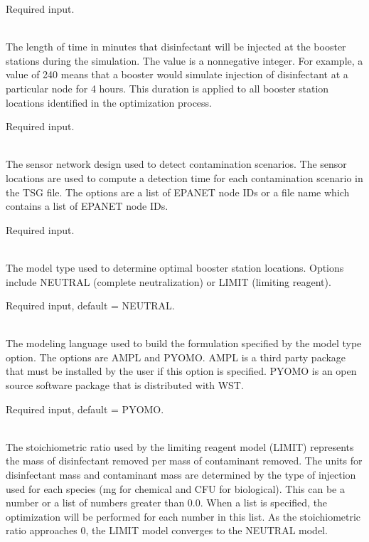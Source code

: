 \begin{description}[topsep=0pt,parsep=0.5em,itemsep=-0.4em]
\begin{description}[topsep=0pt,parsep=0.5em,itemsep=-0.4em]
                Required input.
    \item[{duration}]\hfill
\\The length of time in minutes that disinfectant will be injected at the booster 
                stations during the simulation.	The value is a nonnegative integer. For example, 
                a value of 240 means that a booster would simulate injection of disinfectant 
                at a particular node for 4 hours. This duration is applied to all booster 
                station locations identified in the optimization process.
                
                Required input.
  \end{description}
  \item[{booster mip}]\hfill
  \begin{description}[topsep=0pt,parsep=0.5em,itemsep=-0.4em]
    \item[{detection}]\hfill
\\The sensor network design used to detect contamination scenarios. The
                sensor locations are used to compute a detection time for each 
                contamination scenario in the TSG file. The options are a list of 
                EPANET node IDs or a file name which contains a list of EPANET node IDs.
                
                Required input.
    \item[{model type}]\hfill
\\The model type used to determine optimal booster station
                locations. Options include NEUTRAL (complete neutralization)
                or LIMIT (limiting reagent). 
                
                Required input, default = NEUTRAL.
    \item[{model format}]\hfill
\\The modeling language used to build the formulation specified
                by the model type option. The options are AMPL and PYOMO. 
				AMPL is a third party package that must be installed by 
				the user if this option is specified. PYOMO is an open source 
				software package that is distributed with WST. 
                
                Required input, default = PYOMO.
    \item[{stoichiometric ratio}]\hfill
\\The stoichiometric ratio used by the limiting reagent
                model (LIMIT) represents the mass of disinfectant removed per 
                mass of contaminant removed. The units for disinfectant mass 
                and contaminant mass are determined by the type of injection used 
                for each species (mg for chemical and CFU for biological).  
                This can be a number or a list of
                numbers greater than 0.0. When a list is specified, the
                optimization will be performed for each number in this list. As
                the stoichiometric ratio approaches 0, the LIMIT model converges 
                to the NEUTRAL model.
                

\end{description}
\end{description}
